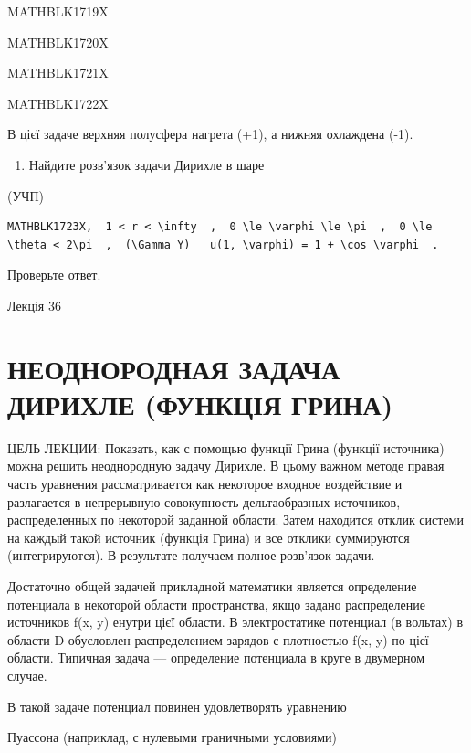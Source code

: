 \documentclass[
  ukrainian,
]{article}
\providecommand{\tightlist}{%
  \setlength{\itemsep}{0pt}\setlength{\parskip}{0pt}}
\begin{document}
MATHBLK1719X

MATHBLK1720X

MATHBLK1721X

MATHBLK1722X

В цієї задаче верхняя полусфера нагрета (+1), а нижняя охлаждена (-1).

\begin{enumerate}
\def\labelenumi{\arabic{enumi}.}
\setcounter{enumi}{5}
\tightlist
\item
  Найдите розв'язок задачи Дирихле в шаре
\end{enumerate}

(УЧП)

\begin{verbatim}
MATHBLK1723X,  1 < r < \infty  ,  0 \le \varphi \le \pi  ,  0 \le \theta < 2\pi  ,  (\Gamma Y)   u(1, \varphi) = 1 + \cos \varphi  .
\end{verbatim}

Проверьте ответ.

Лекція 36

\section{НЕОДНОРОДНАЯ ЗАДАЧА ДИРИХЛЕ (ФУНКЦІЯ
ГРИНА)}\label{ux43dux435ux43eux434ux43dux43eux440ux43eux434ux43dux430ux44f-ux437ux430ux434ux430ux447ux430-ux434ux438ux440ux438ux445ux43bux435-ux444ux443ux43dux43aux446ux456ux44f-ux433ux440ux438ux43dux430}

ЦЕЛЬ ЛЕКЦИИ: Показать, как с помощью функції Грина (функції источника)
можна решить неоднородную задачу Дирихле. В цьому важном методе правая
часть уравнения рассматривается как некоторое входное воздействие и
разлагается в непрерывную совокупность дельтаобразных источников,
распределенных по некоторой заданной области. Затем находится отклик
системи на каждый такой источник (функція Грина) и все отклики
суммируются (интегрируются). В результате получаем полное розв'язок
задачи.

Достаточно общей задачей прикладной математики является определение
потенциала в некоторой области пространства, якщо задано распределение
источников f(x, y) енутри цієї области. В электростатике потенциал (в
вольтах) в области D обусловлен распределением зарядов с плотностью f(x,
y) по цієї области. Типичная задача --- определение потенциала в круге в
двумерном случае.

В такой задаче потенциал повинен удовлетворять уравнению

Пуассона (наприклад, с нулевыми граничными условиями)
\end{document}
